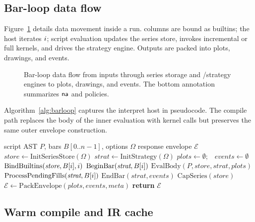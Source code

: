 \documentclass[11pt,a4paper]{article}
\begin{document}
\subsection{Bar-loop data flow}
\label{sec:dataflow}

Figure~\ref{fig:barloop} details data movement inside a run.
\ohlcv{} columns are bound as builtins; the host iterates $i$; script
evaluation updates the series store, invokes incremental or full \ta{} kernels,
and drives the strategy engine.
Outputs are packed into plots, drawings, and events.

\begin{figure}[t]
  \centering
  \resizebox{0.98\textwidth}{!}{}
  \caption{Bar-loop data flow from \ohlcv{} inputs through series storage and
  \ta{}/strategy engines to plots, drawings, and events.
  The bottom annotation summarizes $\textsf{na}{}$ and 
  policies.}
  \label{fig:barloop}
\end{figure}

Algorithm~\ref{alg:barloop} captures the interpret host in pseudocode.
The compile path replaces the body of the inner evaluation with kernel calls
but preserves the same outer envelope construction.

\begin{algorithm}[t]
\caption{Interpret bar-loop host (simplified)}
\label{alg:barloop}
\begin{algorithmic}[1]
\Require script AST $P$, bars $B[0..n-1]$, options $\Omega$
\Ensure response envelope $\mathcal{E}$
\State $\textit{store} \gets \mathrm{InitSeriesStore}(\Omega)$
\State $\textit{strat} \gets \mathrm{InitStrategy}(\Omega)$
\State $\textit{plots} \gets \emptyset$;\ \ $\textit{events} \gets \emptyset$
  \State $\mathrm{BindBuiltins}(\textit{store}, B[i], i)$
  \State $\mathrm{BeginBar}(\textit{strat}, B[i])$
  \State $\mathrm{EvalBody}(P, \textit{store}, \textit{strat}, \textit{plots})$
  \State $\mathrm{ProcessPendingFills}(\textit{strat}, B[i])$
  \State $\mathrm{EndBar}(\textit{strat}, \textit{events})$
  \State $\mathrm{CapSeries}(\textit{store})$ 
\EndFor
\State $\mathcal{E} \gets \mathrm{PackEnvelope}(\textit{plots}, \textit{events}, \textit{meta})$
\State \textbf{return} $\mathcal{E}$
\end{algorithmic}
\end{algorithm}

\subsection{Warm compile and IR cache}
\label{sec:warm}
\end{document}
